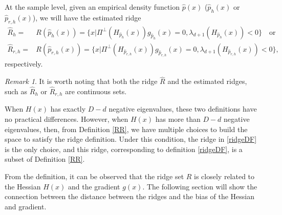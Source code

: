 \documentclass[aos,preprint]{imsart}
\theoremstyle{remark}
\newtheorem*{remark}{Remark}
\begin{document}
At the sample level, given an empirical density function $\hat{p}(x)$ ($\hat{p}_h(x)$ or $\hat{p}_{r, h}(x)$),  we will have the estimated ridge 
\begin{align*}
\hat{R}_h =&R(\hat{p}_h(x))= \{x| \Pi^{\perp}(H_{\hat{p}_{h}}(x)) g_{\hat{p}_{h}}(x) = 0, \lambda_{d+1}(H_{\hat{p}_{h}}(x))<0\} \quad \mbox{or}\\
\hat{R}_{r, h}=& R(\hat{p}_{r,h}(x))=\{x| \Pi^{\perp}(H_{\hat{p}_{r,h}}(x)) g_{\hat{p}_{r,h}}(x) = 0, \lambda_{d+1}(H_{\hat{p}_{r,h}}(x))<0\},
\end{align*} 
respectively. 

\begin{remark}   
It is worth noting that both the ridge $\hat{R}$ and the estimated ridges, such as $\hat{R}_h$ or $\hat{R}_{r,h}$ are continuous sets.
\end{remark}


When $H(x)$ has exactly $D-d$ negative eigenvalues, these two definitions have no practical differences. However, when $H(x)$ has more than $D-d$ negative eigenvalues, then, from Definition \ref{RR}, we have multiple choices to build the space to satisfy the ridge definition. Under this condition, the ridge in \eqref{ridgeDF} is the only choice, and this ridge, corresponding to definition \eqref{ridgeDF}, is a subset of Definition \ref{RR}.

From the definition, it can be observed that the ridge set $R$ is closely related to the Hessian $H(x)$ and the gradient $g(x)$. The following section will show the connection between the distance between the ridges and the bias of the Hessian and gradient.
\end{document}
